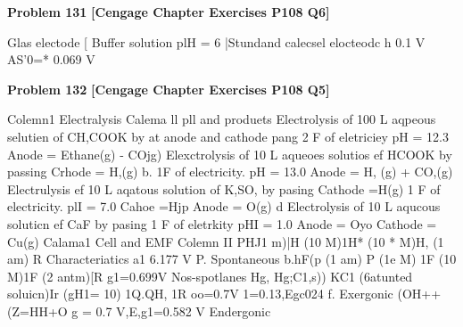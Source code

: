 \begin{problembox}
\textbf{Problem 131} \hfill \textbf{[Cengage Chapter Exercises P108 Q6]}
\label{q:ext-cng-th-131}

Glas electode [ Buffer solution plH = 6 |Stundand calecsel elocteodc
h
0.1 V
AS'0=*
0.069 V
\end{problembox}

\begin{problembox}
\textbf{Problem 132} \hfill \textbf{[Cengage Chapter Exercises P108 Q5]}
\label{q:ext-cng-th-132}

Colemn1
Electralysis
Calema ll
pll and produets
Electrolysis of 100 L aqpeous selutien of CH,COOK by
at anode and cathode
pang 2 F of eletriciey
pH = 12.3
Anode = Ethane(g) - COjg)
Elexctrolysis of 10 L aqueoes solutios ef HCOOK by passing
Crhode = H,(g)
b.
1F of electricity.
pH = 13.0
Anode = H, (g) + CO,(g)
Electrulysis ef 10 L aqatous solution of K,SO, by pasing
Cathode =H(g)
1 F of electricity.
plI = 7.0
Cahoe =Hjp
Anode = O(g)
d Electrolysis of 10 L aqucous soluticn ef CaF by pasing
1 F of eletrkity
pHI = 1.0
Anode = Oyo
Cathode = Cu(g)
Calama1
Cell and EMF
Colemn II
PHJ1 m)|H  (10 M)1H* (10 * M)H, (1 am) R
Characteriatics
a1 6.177 V
P.
Spontaneous
b.hF(p (1 am) P (1e M) 1F (10  M)1F  (2 antm)[R
g1=0.699V
Nos-spotlanes
Hg, Hg;C1,s)) KC1 (6atunted soluicn)Ir (gH1= 10) 1Q.QH, 1R
oo=0.7V
1=0.13,Egc024
f.
Exergonic
(OH++(Z=HH+O
g = 0.7 V,E,g1=0.582 V
Endergonic
\end{problembox}

